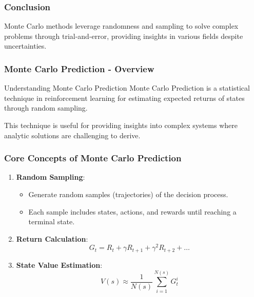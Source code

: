 \documentclass[aspectratio=169]{beamer}
\begin{document}
\begin{frame}[fragile]
    \frametitle{Conclusion}
    Monte Carlo methods leverage randomness and sampling to solve complex problems through trial-and-error, providing insights in various fields despite uncertainties.
\end{frame}

\begin{frame}[fragile]
    \frametitle{Monte Carlo Prediction - Overview}
    \begin{block}{Understanding Monte Carlo Prediction}
        Monte Carlo Prediction is a statistical technique in reinforcement learning for estimating expected returns of states through random sampling.
    \end{block}
    This technique is useful for providing insights into complex systems where analytic solutions are challenging to derive.
\end{frame}

\begin{frame}[fragile]
    \frametitle{Core Concepts of Monte Carlo Prediction}
    \begin{enumerate}
        \item \textbf{Random Sampling}:
        \begin{itemize}
            \item Generate random samples (trajectories) of the decision process.
            \item Each sample includes states, actions, and rewards until reaching a terminal state.
        \end{itemize}

        \item \textbf{Return Calculation}:
        \begin{equation}
        G_t = R_t + \gamma R_{t+1} + \gamma^2 R_{t+2} + \ldots
        \end{equation}

        \item \textbf{State Value Estimation}:
        \begin{equation}
        V(s) \approx \frac{1}{N(s)} \sum_{i=1}^{N(s)} G_t^i
        \end{equation}
    \end{enumerate}
\end{frame}
\end{document}
